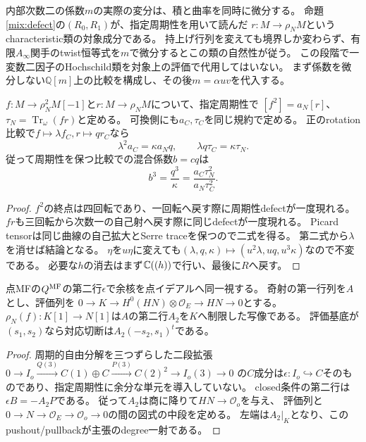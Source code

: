 内部次数二の係数$m$の実際の変分は、積と曲率を同時に微分する。
命題\ref{mix:defect}の$(R_0,R_1)$が、指定周期性を用いて読んだ
$r:M\to\rho_NM$というcharacteristic類の対象成分である。
持上げ行列を変えても境界しか変わらず、有限$A_\infty$関手のtwist恒等式を$m$で微分するとこの類の自然性が従う。
この段階で一変数二因子のHochschild類を対象上の評価で代用してはいない。
まず係数を微分しない$\mathbb Q[m]$上の比較を構成し、その後$m=\alpha uv$を代入する。

\begin{proposition}[scalar消去]\label{mix:scalar}
$f:M\to\rho_N^2M[-1]$と$r:M\to\rho_NM$について、指定周期性で
$[f^2]=a_N[r]$、$\tau_N=\operatorname{Tr}_\omega(fr)$と定める。
可換側にも$a_C,\tau_C$を同じ規約で定める。
正のrotation比較で$f\mapsto\lambda f_C,r\mapsto q r_C$なら
\[
 \lambda^2a_C=\kappa a_Nq,\qquad \lambda q\tau_C=\kappa\tau_N.
\]
従って周期性を保つ比較での混合係数$b=cq$は
\[
 b^3=\frac{q^3}{\kappa}=\frac{a_C\tau_N^2}{a_N\tau_C^2}.
\]
\end{proposition}
\begin{proof}
$f^2$の終点は四回転であり、一回転へ戻す際に周期性defectが一度現れる。
$fr$も三回転から次数一の自己射へ戻す際に同じdefectが一度現れる。
Picard tensorは同じ曲線の自己拡大とSerre traceを保つので二式を得る。
第二式から$\lambda$を消せば結論となる。
$\eta$を$u\eta$に変えても$(\lambda,q,\kappa)\mapsto(u^2\lambda,uq,u^3\kappa)$なので不変である。
必要な$h$の消去はまず$\mathbb C((h))$で行い、最後に$R$へ戻す。
\end{proof}

\begin{lemma}[windowにおける奇射の第二行]
点MFの$Q^{\rm MF}$の第二行$\epsilon$で余核を点イデアルへ同一視する。
奇射の第一行列を$A$とし、評価列を
$0\to K\to H^0(HN)\otimes\mathcal O_E\to HN\to0$とする。
$\rho_N(f):K[1]\to N[1]$は$A$の第二行$A_2$を$K$へ制限した写像である。
評価基底が$(s_1,s_2)$なら対応切断は$A_2(-s_2,s_1)^t$である。
\end{lemma}
\begin{proof}
周期的自由分解を三つずらした二段拡張
$0\to I_o\xrightarrow{Q(3)}C(1)\oplus C\xrightarrow{P(3)}C(2)^2\to I_o(3)\to0$
の$C$成分は$\epsilon:I_o\hookrightarrow C$そのものであり、指定周期性に余分な単元を導入していない。
closed条件の第二行は$\epsilon B=-A_2P$である。
従って$A_2$は商に降りて$HN\to\mathcal O_o$を与え、
評価列と$0\to N\to\mathcal O_E\to\mathcal O_o\to0$の間の図式の中段を定める。
左端は$A_2|_K$となり、このpushout/pullbackが主張のdegree一射である。
\end{proof}

